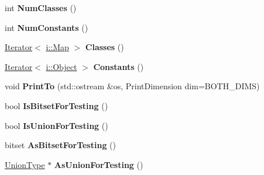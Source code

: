 \begin{DoxyCompactItemize}
\item 
int {\bfseries Num\+Classes} ()\hypertarget{classv8_1_1internal_1_1_type_a29c9a73540b41e66f77ce42b90bcd8a3}{}\label{classv8_1_1internal_1_1_type_a29c9a73540b41e66f77ce42b90bcd8a3}

\item 
int {\bfseries Num\+Constants} ()\hypertarget{classv8_1_1internal_1_1_type_a6099d7e4daeae4cde538960efbdc8db6}{}\label{classv8_1_1internal_1_1_type_a6099d7e4daeae4cde538960efbdc8db6}

\item 
\hyperlink{classv8_1_1internal_1_1_type_1_1_iterator}{Iterator}$<$ \hyperlink{classv8_1_1internal_1_1_map}{i\+::\+Map} $>$ {\bfseries Classes} ()\hypertarget{classv8_1_1internal_1_1_type_a6136a8f056cf4a467995dc95d59b49fc}{}\label{classv8_1_1internal_1_1_type_a6136a8f056cf4a467995dc95d59b49fc}

\item 
\hyperlink{classv8_1_1internal_1_1_type_1_1_iterator}{Iterator}$<$ \hyperlink{classv8_1_1internal_1_1_object}{i\+::\+Object} $>$ {\bfseries Constants} ()\hypertarget{classv8_1_1internal_1_1_type_a12976a0bacdbf98bd8153eb89ea27d0e}{}\label{classv8_1_1internal_1_1_type_a12976a0bacdbf98bd8153eb89ea27d0e}

\item 
void {\bfseries Print\+To} (std\+::ostream \&os, Print\+Dimension dim=B\+O\+T\+H\+\_\+\+D\+I\+MS)\hypertarget{classv8_1_1internal_1_1_type_a6637c1c4d007314674732df4fbed3e44}{}\label{classv8_1_1internal_1_1_type_a6637c1c4d007314674732df4fbed3e44}

\item 
bool {\bfseries Is\+Bitset\+For\+Testing} ()\hypertarget{classv8_1_1internal_1_1_type_a15e0c5dd191b97191f437a72f66b11b5}{}\label{classv8_1_1internal_1_1_type_a15e0c5dd191b97191f437a72f66b11b5}

\item 
bool {\bfseries Is\+Union\+For\+Testing} ()\hypertarget{classv8_1_1internal_1_1_type_a4179572425f7e2a3ebc980f9fe7dc791}{}\label{classv8_1_1internal_1_1_type_a4179572425f7e2a3ebc980f9fe7dc791}

\item 
bitset {\bfseries As\+Bitset\+For\+Testing} ()\hypertarget{classv8_1_1internal_1_1_type_accb9eb255be8c3bc06b38db78af8918b}{}\label{classv8_1_1internal_1_1_type_accb9eb255be8c3bc06b38db78af8918b}

\item 
\hyperlink{classv8_1_1internal_1_1_union_type}{Union\+Type} $\ast$ {\bfseries As\+Union\+For\+Testing} ()\hypertarget{classv8_1_1internal_1_1_type_a0954e5d0d2ddf2d3cddf27278f7cb455}{}\label{classv8_1_1internal_1_1_type_a0954e5d0d2ddf2d3cddf27278f7cb455}

\end{DoxyCompactItemize}
